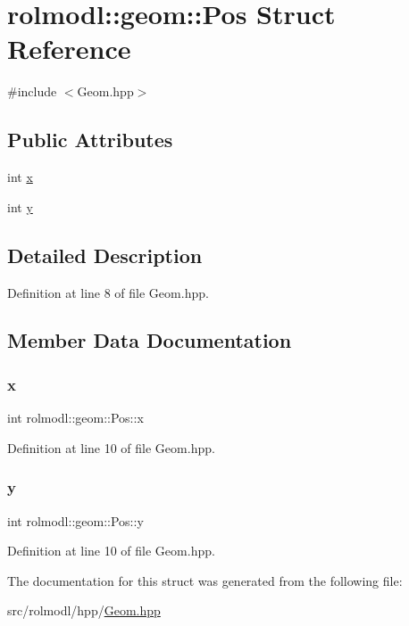 \hypertarget{structrolmodl_1_1geom_1_1_pos}{}\section{rolmodl\+::geom\+::Pos Struct Reference}
\label{structrolmodl_1_1geom_1_1_pos}


{\ttfamily \#include $<$Geom.\+hpp$>$}

\subsection*{Public Attributes}
\begin{DoxyCompactItemize}
\item 
int \mbox{\hyperlink{structrolmodl_1_1geom_1_1_pos_a9b638f514b4ba782cb88d8126df908bb}{x}}
\item 
int \mbox{\hyperlink{structrolmodl_1_1geom_1_1_pos_a2586807e0fe5eda8a48f70368122d460}{y}}
\end{DoxyCompactItemize}


\subsection{Detailed Description}


Definition at line 8 of file Geom.\+hpp.



\subsection{Member Data Documentation}
\mbox{\label{structrolmodl_1_1geom_1_1_pos_a9b638f514b4ba782cb88d8126df908bb}} 
\subsubsection{\texorpdfstring{x}{x}}
{\footnotesize\ttfamily int rolmodl\+::geom\+::\+Pos\+::x}



Definition at line 10 of file Geom.\+hpp.

\mbox{\label{structrolmodl_1_1geom_1_1_pos_a2586807e0fe5eda8a48f70368122d460}} 
\subsubsection{\texorpdfstring{y}{y}}
{\footnotesize\ttfamily int rolmodl\+::geom\+::\+Pos\+::y}



Definition at line 10 of file Geom.\+hpp.



The documentation for this struct was generated from the following file\+:\begin{DoxyCompactItemize}
\item 
src/rolmodl/hpp/\mbox{\hyperlink{_geom_8hpp}{Geom.\+hpp}}\end{DoxyCompactItemize}
